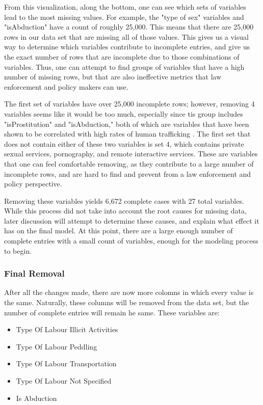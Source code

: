\documentclass{article} %
\begin{document}
From this visualization, along the bottom, one can see which sets of variables lead to the most missing values. For example, the "type of sex" variables and "isAbduction" have a count of roughly 25,000. This means that there are 25,000 rows in our data set that are missing all of those values. This gives us a visual way to determine which variables contribute to incomplete entries, and give us the exact number of rows that are incomplete due to those combinations of variables. Thus, one can attempt to find groups of variables that have a high number of missing rows, but that are also ineffective metrics that law enforcement and policy makers can use. 

The first set of variables have over 25,000 incomplete rows; however, removing 4 variables seems like it would be too much, especially since tis group includes "isProstitution" and "isAbduction," both of which are variables that have been shown to be correlated with high rates of human trafficking \parencite{SlaveBook, polarisTypology}. The first set that does not contain either of these two variables is set 4, which contains private sexual services, pornography, and remote interactive services. These are variables that one can feel comfortable removing, as they contribute to a large number of incomplete rows, and are hard to find and prevent from a law enforcement and policy perspective.

Removing these variables yields 6,672 complete cases with 27 total variables. While this process did not take into account the root causes for missing data, later discussion will attempt to determine these causes, and explain what effect it has on the final model. At this point, there are a large enough number of complete entries with a small count of variables, enough for the modeling process to begin.

\subsubsection{Final Removal}

After all the changes made, there are now more colomns in which every value is the same. Naturally, these columns will be removed from the data set, but the number of complete entries will remain he same. These variables are:

\begin{itemize}
	\item Type Of Labour Illicit Activities
	\item Type Of Labour Peddling	
	\item Type Of Labour Transportation
	\item Type Of Labour Not Specified
	\item Is Abduction		
\end{itemize}
\end{document}
